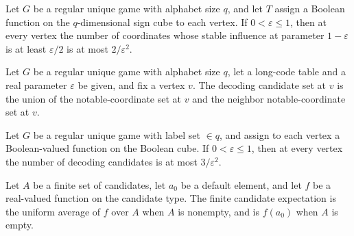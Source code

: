 \begin{theorem}
\label{FABL.RegularUniqueGame.card_notableCoordinates_le}
\leanok
{}
Let $G$ be a regular unique game with alphabet size $q$, and let $T$ assign a Boolean
function on the $q$-dimensional sign cube to each vertex. If $0<\varepsilon\le 1$, then
at every vertex the number of coordinates whose stable influence at parameter
$1-\varepsilon$ is at least $\varepsilon/2$ is at most $2/\varepsilon^2$.
\end{theorem}

\begin{definition}
\label{FABL.RegularUniqueGame.decodingCandidates}
\leanok
{}
Let $G$ be a regular unique game with alphabet size $q$, let a long-code table and a
real parameter $\varepsilon$ be given, and fix a vertex $v$. The decoding candidate set
at $v$ is the union of the notable-coordinate set at $v$ and the neighbor
notable-coordinate set at $v$.
\end{definition}

\begin{theorem}
\label{FABL.RegularUniqueGame.card_decodingCandidates_le}
\leanok
{}
Let $G$ be a regular unique game with label set $\in q$, and assign to each vertex a
Boolean-valued function on the Boolean cube. If $0<ε≤1$, then at every vertex the number
of decoding candidates is at most $3/ε^2$.
\end{theorem}

\begin{definition}
\label{FABL.RegularUniqueGame.finiteCandidateExpectation}
\leanok
Let $A$ be a finite set of candidates, let $a_0$ be a default element, and let $f$ be a
real-valued function on the candidate type. The finite candidate expectation is the
uniform average of $f$ over $A$ when $A$ is nonempty, and is $f(a_0)$ when $A$ is empty.
\end{definition}

